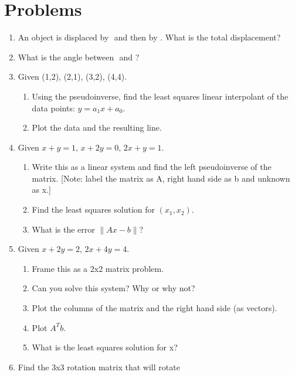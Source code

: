 \hypertarget{problems}{%
\section{Problems}\label{problems}}

\begin{enumerate}
\tightlist
\item
  An object is displaced by \(<10,5,15>\) and then by \(<-5, 20, 0>\).
  What is the total displacement?
\item
  What is the angle between \(<1,2,3>\) and \(<3,2,1>\)?
\item
  Given (1,2), (2,1), (3,2), (4,4).

  \begin{enumerate}
  \def\labelenumii{\alph{enumii}.}
  \tightlist
  \item
    Using the pseudoinverse, find the least squares linear interpolant
    of the data points: \(y = a_1x + a_0\).
  \item
    Plot the data and the resulting line.
  \end{enumerate}
\item
  Given \(x+y = 1\), \(x+2y = 0\), \(2x+y = 1\).

  \begin{enumerate}
  \def\labelenumii{\alph{enumii}.}
  \tightlist
  \item
    Write this as a linear system and find the left pseudoinverse of the
    matrix. {[}Note: label the matrix as A, right hand side as b and
    unknown as x.{]}
  \item
    Find the least squares solution for \((x_1, x_2)\).
  \item
    What is the error \(\| Ax - b\|\)?
  \end{enumerate}
\item
  Given \(x+2y = 2\), \(2x+4y = 4\).

  \begin{enumerate}
  \def\labelenumii{\alph{enumii}.}
  \tightlist
  \item
    Frame this as a 2x2 matrix problem.
  \item
    Can you solve this system? Why or why not?
  \item
    Plot the columns of the matrix and the right hand side (as vectors).
  \item
    Plot \(A^Tb\).
  \item
    What is the least squares solution for x?
  \end{enumerate}
\item
  Find the 3x3 rotation matrix that will rotate


\end{enumerate}
